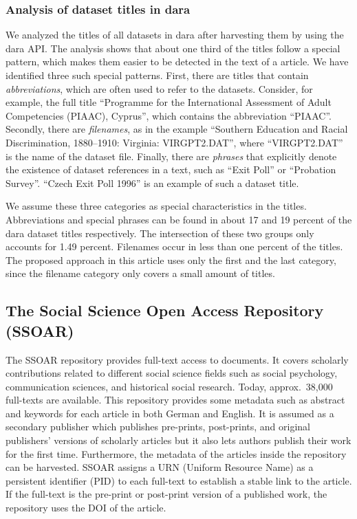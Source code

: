 \documentclass{IOS-Book-Article}
\newcommand{\dara}{\textsf{da\textbar ra}}
\begin{document}
  \subsubsection{Analysis of dataset titles in {\dara}}
  We analyzed the titles of all datasets in {\dara} after harvesting them by using the {\dara} API.
  The analysis shows that about one third of the titles follow a special pattern, which makes them easier to be detected in the text of a article.
  We have identified three such special patterns.
  First, there are titles that contain \emph{abbreviations}, which are often used to refer to the datasets. 
  Consider, for example, the full title \enquote{Programme for the International Assessment of Adult Competencies (PIAAC), Cyprus}, which contains the abbreviation \enquote{PIAAC}.
  Secondly, there are \emph{filenames}, as in the example \enquote{Southern Education and Racial Discrimination, 1880--1910: Virginia: VIRGPT2.DAT}, where \enquote{VIRGPT2.DAT} is the name of the dataset file.
  Finally, there are \emph{phrases} that explicitly denote the existence of 
  dataset references in a text, such as \enquote{Exit Poll} or \enquote{Probation Survey}.
  \enquote{Czech Exit Poll 1996} is an example of such a dataset title. 

  We assume these three categories as special characteristics in the titles.
  Abbreviations and special phrases can be found in about 17 and 19 percent of the {\dara} dataset titles respectively.
  The intersection of these two groups only accounts for 1.49 percent.
  Filenames occur in less than one percent of the titles. 
The proposed approach in this article uses only the first and the last category, since the filename category only covers a small amount of titles.

\subsection{The Social Science Open Access Repository (SSOAR)}
The SSOAR repository provides full-text access to documents.
It covers scholarly contributions related to different social science fields such as social psychology, communication sciences, and historical social research.
Today, approx.\ 38,000 full-texts are available.
This repository provides some metadata such as abstract and keywords for each article in both German and English.
It is assumed as a secondary publisher which publishes pre-prints, post-prints, and original publishers' versions of scholarly articles but it also lets authors publish their work for the first time.
Furthermore, the metadata of the articles inside the repository can be harvested.
SSOAR assigns a URN (Uniform Resource Name) as a persistent identifier (PID) to each full-text to establish a stable link to the article.
If the full-text is the pre-print or post-print version of a published work, the repository uses the DOI of the article.
\end{document}
